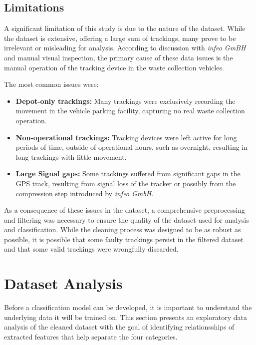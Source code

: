 \documentclass[a4paper,12pt,twoside]{scrreprt}
\begin{document}
\subsection{Limitations}

A significant limitation of this study is due to the nature of the dataset.
While the dataset is extensive, offering a large sum of trackings, many prove
to be irrelevant or misleading for analysis.
According to discussion with \textit{infeo GmBH} and manual visual inspection,
the primary cause of these data issues is the manual operation of the tracking
device in the waste collection vehicles.

The most common issues were:

\begin{itemize}
  \item \textbf{Depot-only trackings:} Many trackings were exclusively
        recording the movement in the vehicle parking facility, capturing no
        real waste
        collection operation.
  \item \textbf{Non-operational trackings:} Tracking devices were left active
        for long periods of time, outside of operational hours, such as
        overnight,
        resulting in long trackings with little movement.
  \item \textbf{Large Signal gaps:} Some trackings suffered from significant
        gaps in the GPS track, resulting from signal loss of the tracker or
        possibly from the compression step introduced by \textit{infeo GmbH}.
\end{itemize}

As a consequence of these issues in the dataset, a comprehensive preprocessing
and filtering was necessary to ensure the quality of the dataset used for
analysis and
classification.
While the cleaning process was designed to be as robust as possible, it is
possible that some faulty trackings persist in the filtered dataset and that
some valid trackings were wrongfully discarded.

\section{Dataset Analysis}
Before a classification model can be developed, it is important to understand
the underlying data it will be trained on.
This section presents an exploratory data analysis of the cleaned dataset with
the goal of identifying relationsships of extracted features that help separate
the
four categories.
\end{document}

